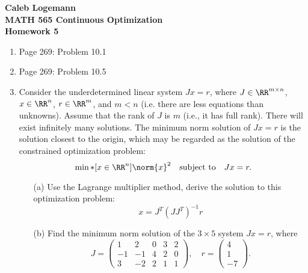 \documentclass[11pt, oneside]{article}
\begin{document}
\noindent \textbf{\Large{Caleb Logemann \\
MATH 565 Continuous Optimization \\
Homework 5
}}

%
\begin{enumerate}
  \item %
    Page 269: Problem 10.1 \\

  \item %
    Page 269: Problem 10.5 \\

  \item %
    Consider the underdetermined linear system $Jx = r$, where
    $J \in \RR^{m \times n}$, $x \in \RR^n$, $r \in \RR^m$, and $m < n$
    (i.e. there are less equations than unknowns).
    Assume that the rank of $J$ is $m$ (i.e., it has full rank).
    There will exist infinitely many solutions.
    The minimum norm solution of $Jx = r$ is the solution closest to the origin,
    which may be regarded as the solution of the constrained optimization problem:
    \[
      \min*[x \in \RR^n]{\norm{x}^2} \quad \text{subject to} \quad Jx = r.
    \]
    \begin{enumerate}
      \item[(a)]
        Use the Lagrange multiplier method, derive the solution to this
        optimization problem:
        \[
          x = J^T (J J^T)^{-1} r
        \]

      \item[(b)]
        Find the minimum norm solution of the $3 \times 5$ system $Jx = r$,
        where
        \[
          J =
          \begin{pmatrix}
            1 & 2 & 0 & 3 & 2 \\
            -1 & -1 & 4 & 2 & 0 \\
            3 & -2 & 2 & 1 & 1
          \end{pmatrix},
          \quad
          r =
          \begin{pmatrix}
            4 \\
            1 \\
            -7
          \end{pmatrix}.
        \]
    \end{enumerate}


\end{enumerate}
\end{document}
